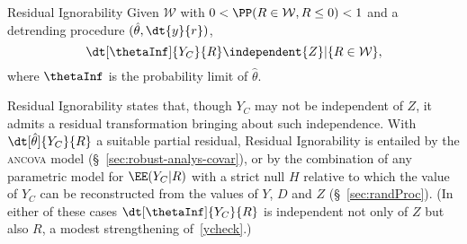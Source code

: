 \begin{ass}{Residual Ignorability}
\sloppy
Given $\mathcal{W}$ with $0< \PP( R \in
\mathcal{W}, R\leq 0) < 1$ and a detrending procedure $(\hat{\theta}, \dt{y}{r})$,
\begin{equation}\label{ycheck}
\dt[\thetaInf]{Y_{C}}{ R }%
\independent {Z}| \{R \in \mathcal{W}\},
\end{equation}
where $\thetaInf$ is the probability limit of $\hat\theta$.
\end{ass}
Residual Ignorability states that, though $Y_C$ may not be independent of
$Z$,  it admits a residual transformation bringing about such
independence.   With $\dt[\hat\theta]{Y_{C}}{ R}$ a suitable
partial residual, Residual Ignorability is entailed by the
\textsc{ancova} model (\S~\ref{sec:robust-analys-covar}), or by the combination of any parametric model
for $\EE (Y_{C}| R)$ with a strict null $H$ relative to which the
value of $Y_{C}$ can be reconstructed from the values of $Y$, $D$ and
$Z$ (\S~\ref{sec:randProc}).
(In either of these cases $\dt[\thetaInf]{Y_{C}}{ R}$
is independent not only of $Z$ but also $R$,
a modest strengthening of~\eqref{ycheck}.)

